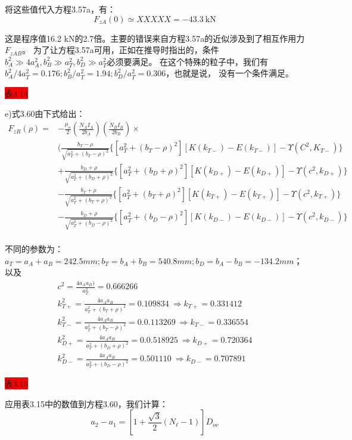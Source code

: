 将这些值代入方程3.57a，有：
\begin{equation}
F_{zA}(0)\simeq XXXXX =-43.3\ \mathrm{kN}
\end{equation}

这是程序值16.2 kN的2.7倍。主要的错误来自方程3.57a的近似涉及到了相互作用力$F_{zAB}$。
为了让方程3.57a可用，正如在推导时指出的，条件$b_A^2\gg  4a_A^2,b^2_B\gg  a_T^2, b_D^2\gg a_T^2$必须要满足。
在这个特殊的粒子中，我们有$b_A^2/4a_T^2=0.176;b^2_B/a_T^2 = 1.94; b_D^2/a_T^2 = 0.306$，也就是说，
没有一个条件满足。

\colorbox{red}{表3.14}

e)式3.60由下式给出：
\begin{equation}
\begin{split}
F_{zR}(\rho)=&-\frac{\mu_{o}}{2}(\frac{N_{A}I_{A}}{2b_{A}})(\frac{N_{B}I_{B}}{2b_{B}})\times\\
&(\frac{b_{T}-\rho}{\sqrt{a_{T}^{2}+(b_{T}-\rho)^{2}}}\{[a_{T}^{2}+(b_{T}-\rho)^{2}][K(k_{T-})-E(k_{T-})]-\Upsilon(C^{2},K_{T-})\}\\
&+\frac{b_{D}+\rho}{\sqrt{a_{T}^{2}+(b_{D}+\rho)^{2}}}\{[a_{T}^{2}+(b_{D}+\rho)^{2}][K(k_{D+})-E(k_{D+})]-\Upsilon(c^{2},k_{D+})\}\\
&-\frac{b_{T}+\rho}{\sqrt{a_{T}^{2}+(b_{T}+\rho)^{2}}}\{[a_{T}^{2}+(b_{T}+\rho)^{2}][K(k_{T+})-E(k_{T+})]-\Upsilon(c^{2},k_{T+})\}\\
&-\frac{b_{D}+\rho}{\sqrt{a_{T}^{2}+(b_{D}-\rho)^{2}}}\{[a_{T}^{2}+(b_{D}-\rho)^{2}][K(k_{D-})-E(k_{D-})]-\Upsilon(c^{2},k_{D-})\}\\%
\end{split}
\end{equation}

不同的参数为：$a_T=a_A+a_B=242.5 mm;b_T=b_A+b_B=540.8 mm; b_D=b_A−b_B=−134.2 mm$；以及
\begin{eqnarray}
c^2=\frac{4a_A a_B)}{a_T^2}=0.666266\\
k_{T+}^2=\frac{4a_A a_B}{a_T^2+(b_T+\rho)^2}=0.109834\ \Rightarrow k_{T+}=0.331412\\
k_{T-}^2=\frac{4a_A a_B}{a_T^2+(b_T-\rho)^2}=0.0.113269\ \Rightarrow k_{T-}=0.336554\\
k_{D+}^2=\frac{4a_A a_B}{a_T^2+(b_D+\rho)^2}=0.0.518925\ \Rightarrow k_{D+}=0.720364\\
k_{D-}^2=\frac{4a_A a_B}{a_T^2+(b_D-\rho)^2}=0.501110\ \Rightarrow k_{D-}=0.707891
\end{eqnarray}

\colorbox{red}{表3.15}

应用表3.15中的数值到方程3.60，我们计算：
$$
a_{2}-a_{1}=[1+\frac{\sqrt{3}}{2}(N_{\ell}-1)]D_{ov}%
$$

